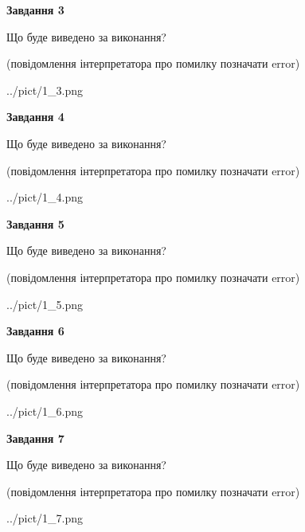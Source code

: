 \documentclass[12pt, ukrainian]{article}
\begin{document}
{\begin {large}
{\begin {center}\textbf{Завдання 3}\end {center}}\par
Що буде виведено за виконання?\par
 (повідомлення інтерпретатора про помилку позначати error)\par
\begin{center}
	{../pict/1_3.png}
\end{center}
\newpage

{\begin {center}\textbf{Завдання 4}\end {center}}\par
Що буде виведено за виконання?\par
 (повідомлення інтерпретатора про помилку позначати error)\par
\begin{center}
	{../pict/1_4.png}
\end{center}
\newpage

{\begin {center}\textbf{Завдання 5}\end {center}}\par
Що буде виведено за виконання?\par
 (повідомлення інтерпретатора про помилку позначати error)\par
\begin{center}
	{../pict/1_5.png}
\end{center}
\newpage

{\begin {center}\textbf{Завдання 6}\end {center}}\par
Що буде виведено за виконання?\par
 (повідомлення інтерпретатора про помилку позначати error)\par
\begin{center}
	{../pict/1_6.png}
\end{center}
\newpage

{\begin {center}\textbf{Завдання 7}\end {center}}\par
Що буде виведено за виконання?\par
 (повідомлення інтерпретатора про помилку позначати error)\par
\begin{center}
	{../pict/1_7.png}
\end{center}
\newpage


\end{large}}
\end{document}

